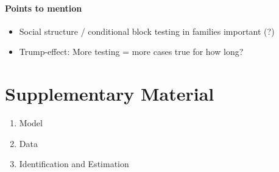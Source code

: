 \paragraph{Points to mention}
\begin{itemize}
    \item Social structure / conditional block testing in families important (?)
    \item Trump-effect: More testing = more cases true for how long?
\end{itemize}







\section{Supplementary Material}

\begin{enumerate}
    \item Model
    \item Data
    \item Identification and Estimation
\end{enumerate}